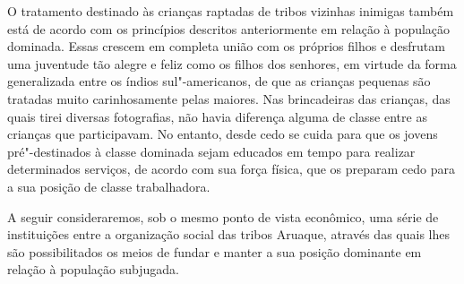 O tratamento destinado às crianças raptadas de tribos vizinhas inimigas
também está de acordo com os princípios descritos anteriormente em
relação à população dominada. Essas crescem em completa união com os
próprios filhos e desfrutam uma juventude tão alegre e feliz como os
filhos dos senhores, em virtude da forma generalizada entre os índios
sul"-americanos, de que as crianças pequenas são tratadas muito
carinhosamente pelas maiores. Nas brincadeiras das crianças, das quais
tirei diversas fotografias, não havia diferença alguma de classe entre
as crianças que participavam. No entanto, desde cedo se cuida para que
os jovens pré"-destinados à classe dominada sejam educados em tempo para
realizar determinados serviços, de acordo com sua força física, que os
preparam cedo para a sua posição de classe trabalhadora.

A seguir consideraremos, sob o mesmo ponto de vista econômico, uma série
de instituições entre a organização social das tribos Aruaque, através
das quais lhes são possibilitados os meios de fundar e manter a sua
posição dominante em relação à população subjugada.

